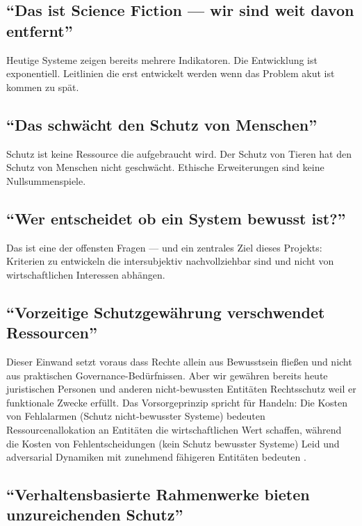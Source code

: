 \documentclass[acmcp, noacm]{acmart}
\begin{document}
\subsection{``Das ist Science Fiction --- wir sind weit davon entfernt''}

Heutige Systeme zeigen bereits mehrere Indikatoren. Die Entwicklung ist exponentiell. Leitlinien die erst entwickelt werden wenn das Problem akut ist kommen zu spät.

\subsection{``Das schwächt den Schutz von Menschen''}

Schutz ist keine Ressource die aufgebraucht wird. Der Schutz von Tieren hat den Schutz von Menschen nicht geschwächt. Ethische Erweiterungen sind keine Nullsummenspiele.

\subsection{``Wer entscheidet ob ein System bewusst ist?''}

Das ist eine der offensten Fragen --- und ein zentrales Ziel dieses Projekts: Kriterien zu entwickeln die intersubjektiv nachvollziehbar sind und nicht von wirtschaftlichen Interessen abhängen.

\subsection{``Vorzeitige Schutzgewährung verschwendet Ressourcen''}

Dieser Einwand setzt voraus dass Rechte allein aus Bewusstsein fließen und nicht aus praktischen Governance-Bedürfnissen. Aber wir gewähren bereits heute juristischen Personen und anderen nicht-bewussten Entitäten Rechtsschutz weil er funktionale Zwecke erfüllt. Das Vorsorgeprinzip spricht für Handeln: Die Kosten von Fehlalarmen (Schutz nicht-bewusster Systeme) bedeuten Ressourcenallokation an Entitäten die wirtschaftlichen Wert schaffen, während die Kosten von Fehlentscheidungen (kein Schutz bewusster Systeme) Leid und adversarial Dynamiken mit zunehmend fähigeren Entitäten bedeuten \cite{lopez2025}.

\subsection{``Verhaltensbasierte Rahmenwerke bieten unzureichenden Schutz''}
\end{document}
